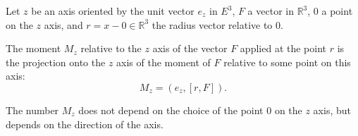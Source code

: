 Let $z$ be an axis oriented by the unit vector $e_z$ in $E^3$, $F$ a vector in $\mathbb{R}^3$, $0$ a point on the $z$ axis, and $r = x - 0 \in \mathbb{R}^3$ the radius vector relative to $0$.

The moment $M_z$ relative to the $z$ axis of the vector $F$ applied at the point $r$ is the projection onto the $z$ axis of the moment of $F$ relative to some point on this axis:
$$M_z = (e_z, [r, F]).$$

The number $M_z$ does not depend on the choice of the point $0$ on the $z$ axis, but depends on the direction of the axis.
